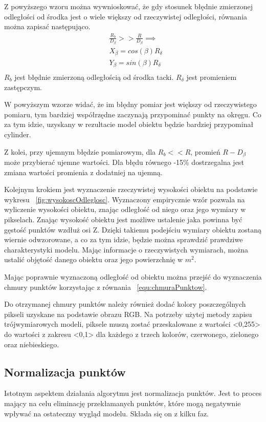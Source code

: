Z powyższego wzoru można wywnioskować, że gdy stosunek błędnie zmierzonej odległości od środka jest o wiele większy od rzeczywistej odległości, równania można zapisać następująco.
\begin{equation}
    \begin{aligned}
            &\frac{R_{b}}{D_{\beta}}>>\frac{R}{D_{\beta}} \implies\\
            & X_{\beta}=cos(\beta)R_{\delta}  \\
            & Y_{\beta}=sin(\beta)R_{\delta}  \\

    \end{aligned}
\end{equation}
$R_{b}$ jest błędnie zmierzoną odległością od środka tacki. $R_{\delta}$ jest promieniem zastępczym.

W powyższym wzorze widać, że im błędny pomiar jest większy od rzeczywistego pomiaru, tym bardziej współrzędne zaczynają przypominać punkty na okręgu. Co za tym idzie, uzyskany w rezultacie model obiektu będzie bardziej przypominał cylinder.

Z kolei, przy ujemnym błędzie pomiarowym, dla $R_{b}<<R$, promień $R-D_{\beta}$ może przybierać ujemne wartości. Dla błędu równego -15\% dostrzegalna jest zmiana wartości promienia z dodatniej na ujemną. 

Kolejnym krokiem jest wyznaczenie rzeczywistej wysokości obiektu na podstawie wykresu ~\ref{fig:wysokoscOdleglosc}. Wyznaczony empirycznie wzór pozwala na wyliczenie wysokości obiektu, znając odległość od niego oraz jego wymiary w pikselach. Znając wysokość obiektu jest możliwe ustalenie jaka powinna być gęstość punktów wzdłuż osi Z. Dzięki takiemu podejściu wymiary obiektu zostaną wiernie odwzorowane, a co za tym idzie, będzie można sprawdzić prawdziwe charakterystyki modelu. Mając informacje o rzeczywistych wymiarach, można ustalić objętość danego obiektu oraz jego powierzchnię w $m^2$.

Mając poprawnie wyznaczoną odległość od obiektu można przejść do wyznaczenia chmury punktów korzystając z równania ~\ref{equ:chmuraPunktow}. 

Do otrzymanej chmury punktów należy również dodać kolory poszczególnych pikseli uzyskane na podstawie obrazu RGB. Na potrzeby użytej metody zapisu trójwymiarowych modeli, piksele muszą zostać przeskalowane z wartości <0,255> do wartości z zakresu <0,1> dla każdego z trzech kolorów, czerwonego, zielonego oraz niebieskiego.
\subsection{Normalizacja punktów}
Istotnym aspektem działania algorytmu jest normalizacja punktów. Jest to proces mający na celu eliminację przekłamanych punktów, które mogą negatywnie wpływać na ostateczny wygląd modelu. Składa się on z kilku faz.

